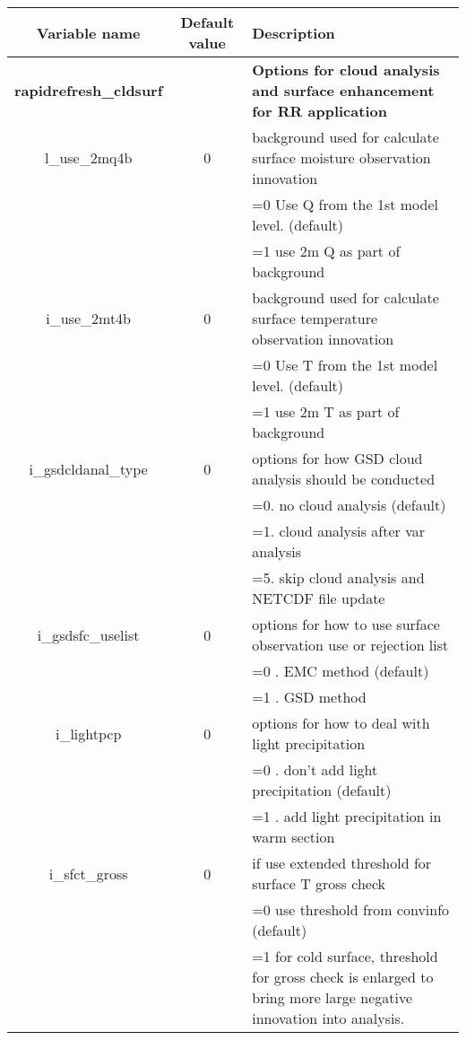  \begin{table}[h]
 \footnotesize
 \center
 \begin{tabular}{| c | c | p{7cm} |}
 \hline
 \hline
 Variable name & Default value & Description \\
 \hline
\textbf{rapidrefresh\_cldsurf} & &  \textbf{Options for cloud analysis and surface enhancement for RR application} \\
 \hline
  l\_use\_2mq4b & 0 & background used for calculate surface moisture observation innovation \\
     && =0  Use Q from the 1st model level. (default) \\
     && =1  use 2m Q as part of background \\
   \hline
 i\_use\_2mt4b & 0 & background used for calculate surface temperature observation innovation \\
     && =0  Use T from the 1st model level. (default) \\
     && =1  use 2m T as part of background \\
 i\_gsdcldanal\_type & 0 & options for how GSD cloud analysis should be conducted \\
        & &  =0. no cloud analysis (default) \\
        & &  =1.  cloud analysis after var analysis \\
        & &  =5.  skip cloud analysis and NETCDF file update \\
 \hline
 i\_gsdsfc\_uselist & 0 & options for how to use surface observation use or rejection list \\
      & & =0 . EMC method (default) \\
      & & =1 . GSD method \\
 \hline
 i\_lightpcp & 0	& options for how to deal with light precipitation \\
     & & =0 . don't add light precipitation (default) \\
     & & =1 . add light precipitation in warm section \\
 \hline
 i\_sfct\_gross & 0 & if use extended threshold for surface T gross check \\
     & & =0 use threshold from convinfo (default) \\
     & & =1 for cold surface, threshold for gross check is enlarged to bring more large negative innovation into analysis. \\
 \hline
 \end{tabular}
\end{table}

